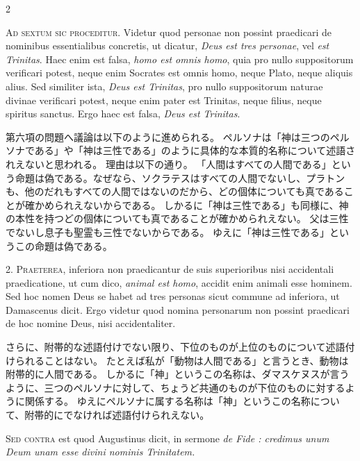 \documentclass[paper=a4paper,fontsize=10pt,jafontsize=9pt,titlepage]{jlreq}
\begin{document}
\begin{paracol}{2}

\textsc{Ad sextum sic proceditur}. Videtur quod personae non possint praedicari de
nominibus essentialibus concretis, ut dicatur, \textit{Deus est tres personae}, vel \textit{est
Trinitas}. Haec enim est falsa, \textit{homo est omnis homo}, quia pro nullo suppositorum
verificari potest, neque enim Socrates est omnis homo, neque Plato, neque
aliquis alius. Sed similiter ista, \textit{Deus est Trinitas}, pro nullo suppositorum
naturae divinae verificari potest, neque enim pater est Trinitas, neque filius,
neque spiritus sanctus. Ergo haec est falsa, \textit{Deus est Trinitas}.

\switchcolumn

第六項の問題へ議論は以下のように進められる。
ペルソナは「神は三つのペルソナである」や「神は三性である」のように具体的な本質的名称について述語されえないと思われる。
理由は以下の通り。
「人間はすべての人間である」という命題は偽である。なぜなら、ソクラテスはすべての人間でないし、プラトンも、他のだれもすべての人間ではないのだから、どの個体についても真であることが確かめられえないからである。
しかるに「神は三性である」も同様に、神の本性を持つどの個体についても真であることが確かめられえない。
父は三性でないし息子も聖霊も三性でないからである。
ゆえに「神は三性である」というこの命題は偽である。

\switchcolumn*

2. \textsc{Praeterea}, inferiora non praedicantur de suis superioribus nisi accidentali
praedicatione, ut cum dico, \textit{animal est homo}, accidit enim animali esse hominem.
Sed hoc nomen Deus se habet ad tres personas sicut commune ad inferiora, ut
Damascenus dicit. Ergo videtur quod nomina personarum non possint praedicari de
hoc nomine Deus, nisi accidentaliter.

\switchcolumn

さらに、附帯的な述語付けでない限り、下位のものが上位のものについて述語付けられることはない。
たとえば私が「動物は人間である」と言うとき、動物は附帯的に人間である。
しかるに「神」というこの名称は、ダマスケヌスが言うように、三つのペルソナに対して、ちょうど共通のものが下位のものに対するように関係する。
ゆえにペルソナに属する名称は「神」というこの名称について、附帯的にでなければ述語付けられえない。

\switchcolumn*

\textsc{Sed contra} est quod Augustinus dicit, in sermone \textit{de Fide : credimus unum Deum
unam esse divini nominis Trinitatem.}


\end{paracol}
\end{document}
